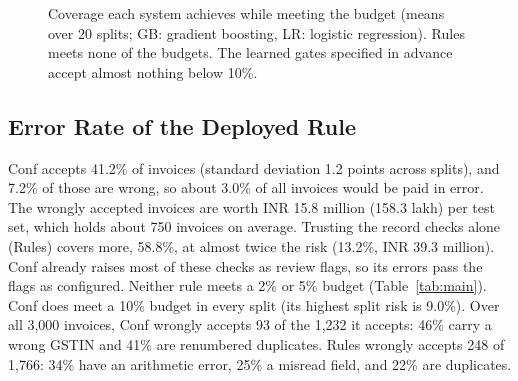 \documentclass[conference]{IEEEtran}
\newcommand{\sysB}{\textsf{Conf}}          %
\newcommand{\sysBl}{\textsf{Conf+LTT}}     %
\newcommand{\sysBtwo}{\textsf{Rules}}      %
\newcommand{\sysBone}{\textsf{G-doc}}      %
\newcommand{\sysP}{\textsf{G-rec}}         %
\newcommand{\sysFC}{\textsf{G-comp}}       %
\newcommand{\sysPdup}{\textsf{G-rec+dup}}  %
\begin{document}
\begin{figure}[t]
\centering
{}
\caption{Coverage each system achieves while meeting the budget (means over 20
splits; GB: gradient boosting, LR: logistic regression). \sysBtwo{} meets none
of the budgets. The learned gates specified in advance accept almost nothing
below 10\%.}
\label{fig:coverage}
\end{figure}

\subsection{Error Rate of the Deployed Rule}\label{sec:rq1}
\sysB{} accepts 41.2\% of invoices (standard deviation
1.2 points across splits), and 7.2\% of those are wrong, so about 3.0\% of all
invoices would be paid in error. The wrongly accepted invoices are worth INR
15.8 million (158.3 lakh) per test set, which holds about 750 invoices on
average. Trusting the record checks alone (\sysBtwo) covers more, 58.8\%, at
almost twice the risk (13.2\%, INR 39.3 million). \sysB{} already raises most of
these checks as review flags, so its errors pass the flags as
configured. Neither rule
meets a 2\% or 5\% budget (Table~\ref{tab:main}). \sysB{} does meet a 10\%
budget in every split (its highest split risk is 9.0\%). Over all 3,000 invoices, \sysB{}
wrongly accepts 93 of the 1,232 it accepts: 46\% carry a wrong GSTIN and 41\% are
renumbered duplicates. \sysBtwo{} wrongly accepts 248 of 1,766: 34\% have an
arithmetic error, 25\% a misread field, and 22\% are duplicates.
\end{document}
